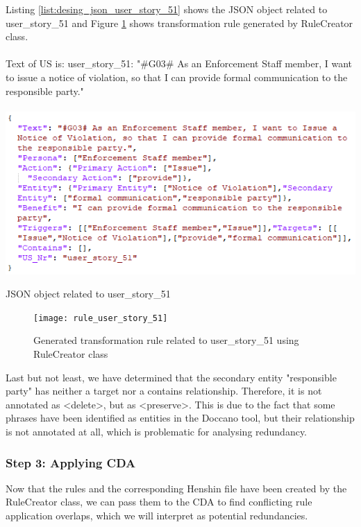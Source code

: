\begin{example}
	Listing \ref{list:desing_json_user_story_51} shows the JSON object related to user\_story\_51 and Figure \ref{fig:desing_rule_user_story_51} shows transformation rule generated by RuleCreator class.\\\\
	Text of US is:
	user\_story\_51: "\#G03\# As an Enforcement Staff member, I want to issue a notice of violation, so that I can provide formal communication to the responsible party."
	\begin{MyListing}
		\paragraph{}
		\centering
		\includegraphics[scale=0.8]{Listing/json_user_story_51.png}
		\caption{JSON object related to user\_story\_51}\label{list:desing_json_user_story_51}
	\end{MyListing}
	\begin{figure}[h]
		\centering
		\texttt{[image: rule\_user\_story\_51]}
		\caption{Generated transformation rule related to user\_story\_51 using RuleCreator class}\label{fig:desing_rule_user_story_51}
	\end{figure}
	Last but not least, we have determined that the secondary entity "responsible party" has neither a target nor a contains relationship. Therefore, it is not annotated as \textless delete\textgreater, but as \textless preserve\textgreater. This is due to the fact that some phrases have been identified as entities in the Doccano tool, but their relationship is not annotated at all, which is problematic for analysing redundancy.
\end{example}
\subsubsection*{Step 3: Applying CDA}\label{step_3}
Now that the rules and the corresponding Henshin file have been created by the RuleCreator class, we can pass them to the CDA to find conflicting rule application overlaps, which we will interpret as potential redundancies.

